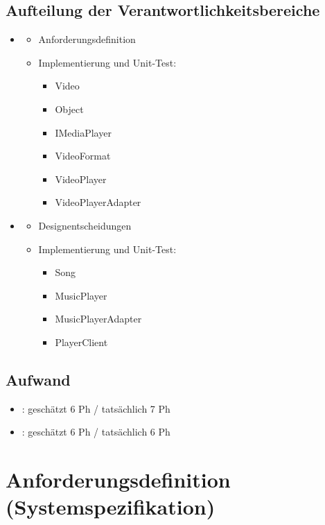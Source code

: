 \subsection{Aufteilung der Verantwortlichkeitsbereiche}
\begin{itemize}
	\item \docauthor
	\begin{itemize}
		\item Anforderungsdefinition
		\item Implementierung und Unit-Test:
		\begin{itemize}
			\item Video
			\item Object
			\item IMediaPlayer
			\item VideoFormat
			\item VideoPlayer
			\item VideoPlayerAdapter
		\end{itemize}
	\end{itemize}
	\item \doccoauthor
	\begin{itemize}
		\item Designentscheidungen
		\item Implementierung und Unit-Test:
		\begin{itemize}
			\item Song
			\item MusicPlayer
			\item MusicPlayerAdapter
			\item PlayerClient
		\end{itemize}
	\end{itemize}	
\end{itemize}

\subsection{Aufwand}

\begin{itemize}
	\item \docauthor: geschätzt 6 Ph / tatsächlich 7 Ph
	\item \doccoauthor: geschätzt 6 Ph / tatsächlich 6 Ph
\end{itemize}

\section{Anforderungsdefinition (Systemspezifikation)}
